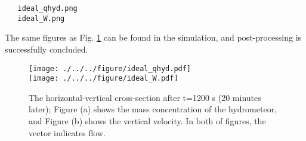 \begin{verbatim}
   ideal_qhyd.png
   ideal_W.png
\end{verbatim}
The same figures as Fig. \ref{fig_ideal} can be found in the simulation,
and post-processing is successfully concluded.

\begin{figure}[htb]
\begin{center}
  \texttt{[image: ./../../figure/ideal\_qhyd.pdf]}\\
  \texttt{[image: ./../../figure/ideal\_W.pdf]}\\
  \caption{The horizontal-vertical cross-section after t=1200 s (20 minutes later);
            Figure (a) shows the mass concentration of the hydrometeor, and 
            Figure (b) shows the vertical velocity. 
            In both of figures, the vector indicates flow.}
  \label{fig_ideal}
\end{center}
\end{figure}

